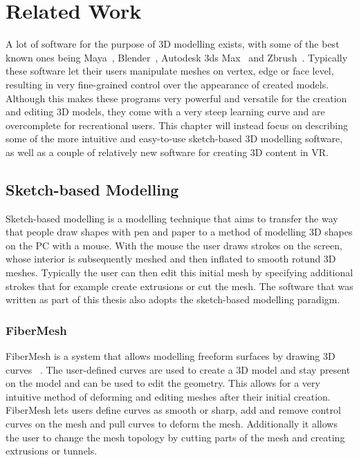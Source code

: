 
\chapter{Related Work}
\label{chap:related}
A lot of software for the purpose of 3D modelling exists, with some of the best known ones being Maya~\cite{Maya}, Blender~\cite{Blender}, Autodesk 3ds Max~\cite{3dsMAX} and Zbrush~\cite{ZBrush}. Typically these software let their users manipulate meshes on vertex, edge or face level, resulting in very fine-grained control over the appearance of created models. Although this makes these programs very powerful and versatile for the creation and editing 3D models, they come with a very steep learning curve and are overcomplete for recreational users. This chapter will instead focus on describing some of the more intuitive and easy-to-use sketch-based 3D modelling software, as well as a couple of relatively new software for creating 3D content in VR. 

\section{Sketch-based Modelling}
Sketch-based modelling is a modelling technique that aims to transfer the way that people draw shapes with pen and paper to a method of modelling 3D shapes on the PC with a mouse. With the mouse the user draws strokes on the screen, whose interior is subsequently meshed and then inflated to smooth rotund 3D meshes. Typically the user can then edit this initial mesh by specifying additional strokes that for example create extrusions or cut the mesh.
The software that was written as part of this thesis also adopts the sketch-based modelling paradigm. 


\subsection{FiberMesh}
\label{subsec:fiber}
FiberMesh is a system that allows modelling freeform surfaces by drawing 3D curves ~\cite{Nealen2007}. The user-defined curves are used to create a 3D model and stay present on the model and can be used to edit the geometry. This allows for a very intuitive method of deforming and editing meshes after their initial creation. FiberMesh lets users define curves as smooth or sharp, add and remove control curves on the mesh and pull curves to deform the mesh. Additionally it allows the user to change the mesh topology by cutting parts of the mesh and creating extrusions or tunnels.

